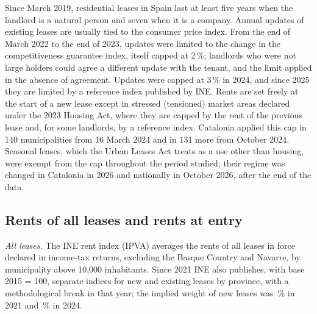 \documentclass[11pt,a4paper]{article}
\begin{document}
Since March 2019, residential leases in Spain last at least five years when the landlord is a natural person and seven when it is a company. Annual updates of existing leases are usually tied to the consumer price index. From the end of March 2022 to the end of 2023, updates were limited to the change in the competitiveness guarantee index, itself capped at 2\,\%; landlords who were not large holders could agree a different update with the tenant, and the limit applied in the absence of agreement. Updates were capped at 3\,\% in 2024, and since 2025 they are limited by a reference index published by INE. Rents are set freely at the start of a new lease except in stressed (tensioned) market areas declared under the 2023 Housing Act, where they are capped by the rent of the previous lease and, for some landlords, by a reference index. Catalonia applied this cap in 140 municipalities from 16 March 2024 and in 131 more from October 2024. Seasonal leases, which the Urban Leases Act treats as a use other than housing, were exempt from the cap throughout the period studied; their regime was changed in Catalonia in 2026 and nationally in October 2026, after the end of the data.

\subsection{Rents of all leases and rents at entry}

\textit{All leases.} The INE rent index (IPVA) averages the rents of all leases in force declared in income-tax returns, excluding the Basque Country and Navarre, by municipality above 10,000 inhabitants. Since 2021 INE also publishes, with base 2015 = 100, separate indices for new and existing leases by province, with a methodological break in that year; the implied weight of new leases was \wNewOne\,\% in 2021 and \wNewFour\,\% in 2024.
\end{document}
